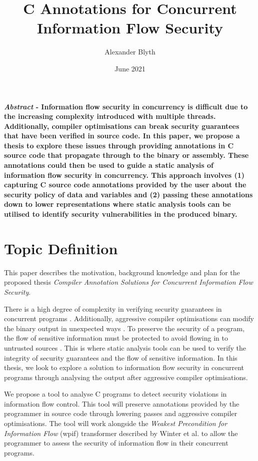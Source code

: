 \documentclass[twocolumn]{article}
\title{C Annotations for Concurrent Information Flow Security}
\author{Alexander Blyth}
\date{June 2021}
\begin{document}
\maketitle

\textbf{\textit{Abstract} - Information flow security in concurrency is difficult due to the increasing complexity introduced with multiple threads. Additionally, compiler optimisations can break security guarantees that have been verified in source code. In this paper, we propose a thesis to explore these issues through providing annotations in C source code that propagate through to the binary or assembly. These annotations could then be used to guide a static analysis of information flow security in concurrency. This approach involves (1) capturing C source code annotations provided by the user about the security policy of data and variables and (2) passing these annotations down to lower representations where static analysis tools can be utilised to identify security vulnerabilities in the produced binary. }

\section{Topic Definition}
This paper describes the motivation, background knowledge and plan for the proposed thesis \textit{Compiler Annotation Solutions for Concurrent Information Flow Security}.

There is a high degree of complexity in verifying security guarantees in concurrent programs \cite{mantel2014noninterference}\cite{smith2019value}\cite{vaughan2012secure}. Additionally, aggressive compiler optimisations can modify the binary output in unexpected ways \cite{d2015correctness}. To preserve the security of a program, the flow of sensitive information must be protected to avoid flowing in to untrusted sources \cite{balliu2014logics}. This is where static analysis tools can be used to verify the integrity of security guarantees and the flow of sensitive information. In this thesis, we look to explore a solution to information flow security in concurrent programs through analysing the output after aggressive compiler optimisations.

We propose a tool to analyse C programs to detect security violations in information flow control. This tool will preserve annotations provided by the programmer in source code through lowering passes and aggressive compiler optimisations. The tool will work alongside the \textit{Weakest Precondition for Information Flow} (wpif) transformer described by Winter et al. \cite{winter2020information} to allow the programmer to assess the security of information flow in their concurrent programs.
\end{document}
